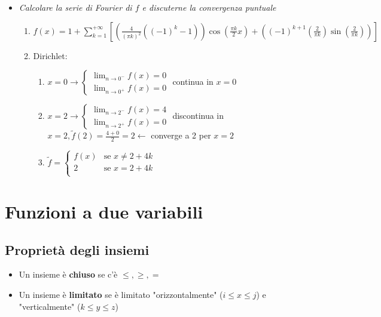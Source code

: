 \documentclass[10pt, a4paper]{article}
\begin{document}
\begin{itemize}
\begin{enumerate}
        \end{enumerate}
        \item \textit{Calcolare la serie di Fourier di $f$ e discuterne la convergenza puntuale} \begin{enumerate}
            \item $\displaystyle f(x)=1+\sum_{k=1}^{+\infty}\left[\left(\frac{4}{(\pi k)^2}((-1)^k-1)\right)\cos\left(\frac{\pi k}{2}x\right)+\left((-1)^{k+1}\left(\frac{2}{\pi k}\right)\sin\left(\frac{2}{\pi k}\right)\right)\right]$
            \item Dirichlet: \begin{enumerate}
                \item $\displaystyle x=0\rightarrow\begin{cases}
                    \lim_{n\to 0^-} f(x) = 0\\
                    \lim_{n\to 0^+} f(x) = 0
                \end{cases}$ continua in $x=0$
                \item $\displaystyle x=2\rightarrow\begin{cases}
                    \lim_{n\to 2^-} f(x) = 4\\
                    \lim_{n\to 2^+} f(x) = 0
                \end{cases}$ discontinua in $x=2, \tilde{f}(2)=\frac{4+0}{2}=2\leftarrow$ converge a 2 per $x=2$
                \item $\displaystyle \tilde{f}=\begin{cases}
                    f(x) & \text{se } x\neq 2+4k\\
                    2 & \text{se } x= 2+4k\\
                \end{cases}$
            \end{enumerate}
        \end{enumerate}
    \end{itemize}
\section{Funzioni a due variabili}
    \subsection{Proprietà degli insiemi}
        \begin{itemize}
            \item Un insieme è \textbf{chiuso} se c'è $\leq,\geq,=$
            \item Un insieme è \textbf{limitato} se è limitato "orizzontalmente" ($i\leq x\leq j$) e "verticalmente" ($k\leq y\leq z$)
        \end{itemize}
\end{document}
